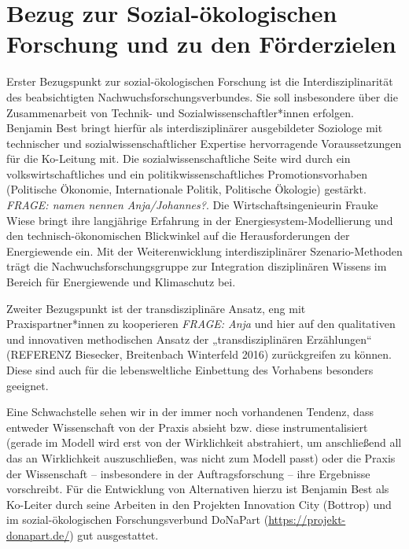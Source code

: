\documentclass[a4paper,11pt,twoside]{scrartcl}
\begin{document}
\section{Bezug zur Sozial-ökologischen Forschung und zu den Förderzielen}


Erster Bezugspunkt zur sozial-ökologischen Forschung ist die Interdisziplinarität des beabsichtigten Nachwuchsforschungsverbundes. Sie soll insbesondere über die Zusammenarbeit von Technik- und Sozialwissenschaftler*innen erfolgen. Benjamin Best bringt hierfür als interdisziplinärer ausgebildeter Soziologe mit technischer und sozialwissenschaftlicher Expertise hervorragende Voraussetzungen für die Ko-Leitung mit. Die sozialwissenschaftliche Seite wird durch ein volkswirtschaftliches und ein politikwissenschaftliches Promotionsvorhaben (Politische Ökonomie, Internationale Politik, Politische Ökologie) gestärkt. \textit{FRAGE: namen nennen Anja/Johannes?}.
Die Wirtschaftsingenieurin Frauke Wiese bringt ihre langjährige Erfahrung in der Energiesystem-Modellierung und den technisch-ökonomischen Blickwinkel auf die Herausforderungen der Energiewende ein. Mit der Weiterenwicklung interdisziplinärer Szenario-Methoden trägt die Nachwuchsforschungsgruppe zur Integration disziplinären Wissens im Bereich für Energiewende und Klimaschutz bei.

Zweiter Bezugspunkt ist der transdisziplinäre Ansatz, eng mit Praxispartner*innen zu kooperieren \textit{FRAGE: Anja} und hier auf den qualitativen und innovativen methodischen Ansatz der „transdisziplinären Erzählungen“ (REFERENZ Biesecker, Breitenbach Winterfeld 2016) zurückgreifen zu können. Diese sind auch für die lebensweltliche Einbettung des Vorhabens besonders geeignet.

Eine Schwachstelle sehen wir in der immer noch vorhandenen Tendenz, dass entweder Wissenschaft von der Praxis absieht bzw. diese instrumentalisiert (gerade im Modell wird erst von der Wirklichkeit abstrahiert, um anschließend all das an Wirklichkeit auszuschließen, was nicht zum Modell passt) oder die Praxis der Wissenschaft – insbesondere in der Auftragsforschung – ihre Ergebnisse vorschreibt. Für die Entwicklung von Alternativen hierzu ist Benjamin Best als Ko-Leiter durch seine Arbeiten in den Projekten Innovation City (Bottrop) und im sozial-ökologischen Forschungsverbund DoNaPart (\url{https://projekt-donapart.de/}) gut ausgestattet. 
\end{document}
